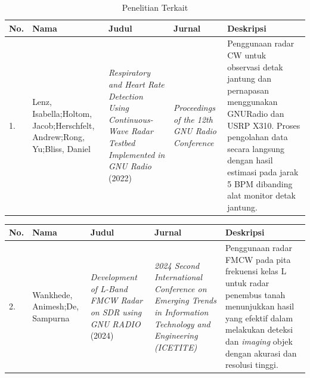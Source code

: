 \begin{center}			%
	\begin{longtable}{|p{0.5cm}|p{2cm}|p{3cm}|p{2cm}|p{3.5cm}|}
	\caption{Penelitian Terkait}
	\label{tab:PenelitianDulu}\\
	\hline
	\textbf{No.} & \textbf{Nama} & \textbf{Judul} &\textbf{Jurnal} & \textbf{Deskripsi}\\
	\hline
	1.& Lenz, Isabella;\newline Holtom, Jacob;\newline Herschfelt, Andrew;\newline Rong, Yu;\newline Bliss, Daniel 
	& \textit{Respiratory and Heart Rate Detection Using Continuous-Wave Radar Testbed Implemented in GNU Radio } (2022)
	& \textit{Proceedings of the 12th GNU Radio Conference}
	& Penggunaan radar CW untuk observasi detak jantung dan pernapasan menggunakan GNURadio dan USRP X310. Proses pengolahan data secara langsung dengan hasil estimasi pada jarak 5 BPM dibanding alat monitor detak jantung. 
	\\ \hline
	\end{longtable}

	\vspace{3cm}

	\begin{longtable}{|p{0.5cm}|p{2cm}|p{3cm}|p{2.5cm}|p{4cm}|}
	\hline
	\textbf{No.} & \textbf{Nama} & \textbf{Judul} &\textbf{Jurnal} & \textbf{Deskripsi}\\
	\hline
	2. 	& Wankhede, Animesh;\newline De, Sampurna
	& \textit{Development of L-Band FMCW Radar on SDR using GNU RADIO} (2024)
	& \textit{2024 Second International Conference on Emerging Trends in Information Technology and Engineering (ICETITE)}
	& Penggunaan radar FMCW pada pita frekuensi kelas L untuk radar penembus tanah menunjukkan hasil yang efektif dalam melakukan deteksi dan \textit{imaging} objek dengan akurasi dan resolusi tinggi. \\ \hline
	

\end{longtable}
\end{center}
